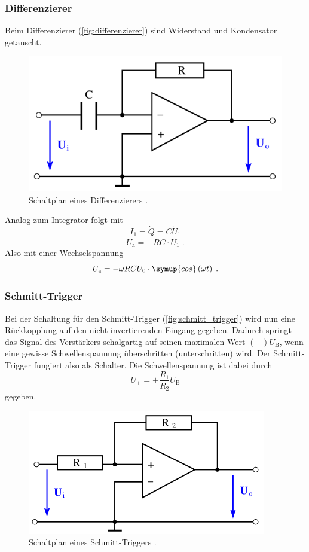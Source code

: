 \subsubsection{Differenzierer}
Beim Differenzierer (\autoref{fig:differenzierer}) sind Widerstand und Kondensator getauscht.
\begin{figure}
    \centering
    \includegraphics[width = .5\textwidth]{"content/pics/differenzierer.png"}
    \caption{Schaltplan eines Differenzierers \cite{v51}.}
    \label{fig:differenzierer}
\end{figure}
Analog zum Integrator folgt mit 
\begin{equation*}
    I_1 = \dot{Q} = C \dot{U}_1
\end{equation*}
\begin{equation}
    U_\text{a} = -RC \cdot \dot{U}_1 \;.
    \label{eq:differenzierer1}
\end{equation}
Also mit einer Wechselspannung
\begin{equation}
    U_\text{a} = -\omega RC U_0 \cdot \symup{cos}\left(\omega t\right) \;.
    \label{eq:differenzierer2}
\end{equation}
\subsubsection{Schmitt-Trigger}
Bei der Schaltung für den Schmitt-Trigger (\autoref{fig:schmitt_trigger}) wird nun eine Rückkopplung auf den nicht-invertierenden Eingang gegeben.
Dadurch springt das Signal des Verstärkers schalgartig auf seinen maximalen Wert $(-) U_\text{B}$, wenn eine gewisse Schwellenspannung überschritten (unterschritten) wird.
Der Schmitt-Trigger fungiert also als Schalter.
Die Schwellenspannung ist dabei durch 
\begin{equation}
    U_{\pm} = \pm \frac{R_1}{R_2} U_\text{B}
    \label{eq:schmitt_trigger}
\end{equation}
gegeben.
\begin{figure}
    \centering
    \includegraphics[width = .5\textwidth]{"content/pics/schmitt_trigger.png"}
    \caption{Schaltplan eines Schmitt-Triggers \cite{v51}.}
    \label{fig:schmitt_trigger}
\end{figure}

